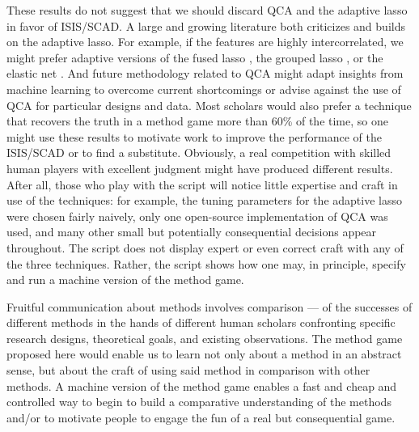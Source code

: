 \documentclass[12pt]{article}
\begin{document}
These results do not suggest that we should discard QCA and the adaptive lasso
in favor of ISIS/SCAD.  A large and growing literature both criticizes and
builds on the adaptive lasso. For example, if the features are highly
intercorrelated, we might prefer adaptive versions of the fused lasso
\citep{rinaldo2009properties}, the grouped lasso \citep{wang2008note}, or the
elastic net \citep{ghosh2011grouped, zou2004regression}. And future
methodology related to QCA might adapt insights from machine learning to
overcome current shortcomings or advise against the use of QCA for particular
designs and data.  Most scholars would also prefer a technique
that recovers the truth in a method game more than 60\% of the time, so one might
use these results to motivate work to improve the performance of the ISIS/SCAD
or to find a substitute. Obviously, a real competition with skilled human players
with excellent judgment might have produced different results.  After all,
those who play with the script will notice little expertise and craft in use
of the techniques: for example, the tuning parameters for the adaptive lasso
were chosen fairly naively, only one open-source implementation of QCA was
used, and many other small but potentially consequential decisions appear
throughout.  The script does not display expert or even correct craft with any
of the three techniques.  Rather, the script shows how one may, in principle,
specify and run a machine version of the method game.

Fruitful communication about methods involves comparison --- of the successes
of different methods in the hands of different human scholars confronting
specific research designs, theoretical goals, and existing observations. The
method game proposed here would enable us to learn not only about a method in
an abstract sense, but about the craft of using said method in comparison with
other methods. A machine version of the method game enables a fast and cheap
and controlled way to begin to build a comparative understanding of the
methods and/or to motivate people to engage the fun of a real but
consequential game.





\end{document}
